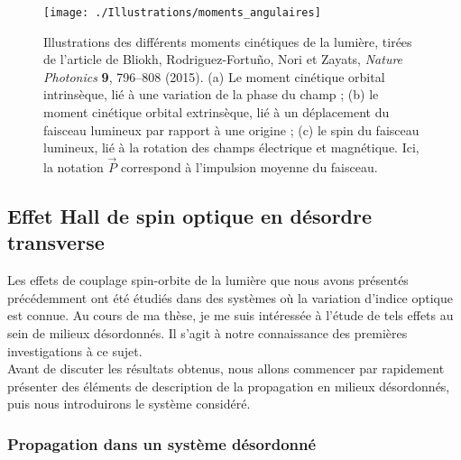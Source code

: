 \documentclass[a4paper,11pt]{article} %
\begin{document}
	
	
	\begin{figure}[h]
		\centering
		\begin{minipage}[c]{0.9\linewidth}
			\centering
			\texttt{[image: ./Illustrations/moments\_angulaires]}
			\caption{Illustrations des différents moments cinétiques de la lumière, tirées de l'article de Bliokh, Rodriguez-Fortuño, Nori et Zayats, \textit{Nature Photonics} \textbf{9}, 796--808 (2015). (a) Le moment cinétique orbital intrinsèque, lié à une variation de la phase du champ ; (b) le moment cinétique orbital extrinsèque, lié à un déplacement du faisceau lumineux par rapport à une origine ; (c) le spin du faisceau lumineux, lié à la rotation des champs électrique et magnétique. Ici, la notation $ \vec{P} $ correspond à l'impulsion moyenne du faisceau.}
			\label{fig:moments_angulaires}
		\end{minipage}
	\end{figure}
	
	\subsection{Effet Hall de spin optique en désordre transverse}
	Les effets de couplage spin-orbite de la lumière que nous avons présentés précédemment ont été étudiés dans des systèmes où la variation d'indice optique est connue. Au cours de ma thèse, je me suis intéressée à l'étude de tels effets au sein de milieux désordonnés. Il s'agit à notre connaissance des premières investigations à ce sujet.\\
	Avant de discuter les résultats obtenus, nous allons commencer par rapidement présenter des éléments de description de la propagation en milieux désordonnés, puis nous introduirons le système considéré.
	
	\subsubsection{Propagation dans un système désordonné}
	
\end{document}
